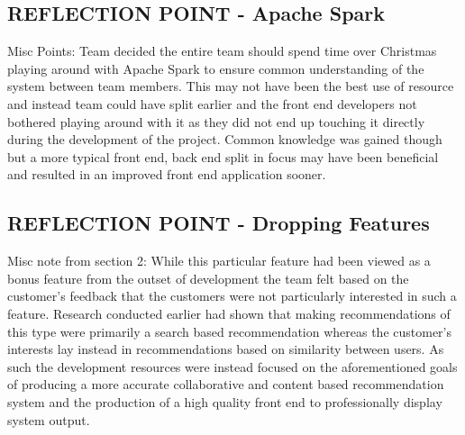\documentclass{l3proj}
\begin{document}

\subsection{REFLECTION POINT - Apache Spark}
\label{sparkreflection}
Misc Points:
Team decided the entire team should spend time over Christmas playing around with Apache Spark to ensure common understanding of the system between team members. This may not have been the best use of resource and instead team could have split earlier and the front end developers not bothered playing around with it as they did not end up touching it directly during the development of the project. Common knowledge was gained though but a more typical front end, back end split in focus may have been beneficial and resulted in an improved front end application sooner.



\subsection{REFLECTION POINT - Dropping Features}
\label{droppingreflection}

Misc note from section 2:
While this particular feature had been viewed as a bonus feature from the outset of development the team felt based on the customer’s feedback that the customers were not particularly interested in such a feature. Research conducted earlier had shown that making recommendations of this type were primarily a search based recommendation whereas the customer’s interests lay instead in recommendations based on similarity between users. As such the development resources were instead focused on the aforementioned goals of producing a more accurate collaborative and content based recommendation system and the production of a high quality front end to professionally display system output. 

\end{document}
